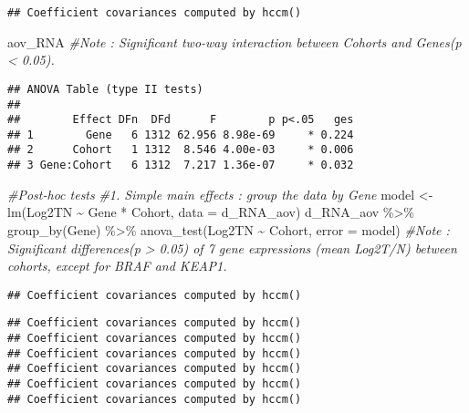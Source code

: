 \documentclass[
]{article}
\newenvironment{Shaded}{\begin{snugshade}}{\end{snugshade}}
\newcommand{\AttributeTok}[1]{\textcolor[rgb]{0.77,0.63,0.00}{#1}}
\newcommand{\CommentTok}[1]{\textcolor[rgb]{0.56,0.35,0.01}{\textit{#1}}}
\newcommand{\FunctionTok}[1]{\textcolor[rgb]{0.00,0.00,0.00}{#1}}
\newcommand{\NormalTok}[1]{#1}
\newcommand{\OtherTok}[1]{\textcolor[rgb]{0.56,0.35,0.01}{#1}}
\newcommand{\SpecialCharTok}[1]{\textcolor[rgb]{0.00,0.00,0.00}{#1}}
\begin{document}
\begin{verbatim}
## Coefficient covariances computed by hccm()
\end{verbatim}

\begin{Shaded}
\begin{Highlighting}[]
\NormalTok{aov\_RNA }\CommentTok{\#Note : Significant two{-}way interaction between Cohorts and Genes(p \textless{} 0.05).}
\end{Highlighting}
\end{Shaded}

\begin{verbatim}
## ANOVA Table (type II tests)
## 
##        Effect DFn  DFd      F        p p<.05   ges
## 1        Gene   6 1312 62.956 8.98e-69     * 0.224
## 2      Cohort   1 1312  8.546 4.00e-03     * 0.006
## 3 Gene:Cohort   6 1312  7.217 1.36e-07     * 0.032
\end{verbatim}

\begin{Shaded}
\begin{Highlighting}[]
\CommentTok{\#Post{-}hoc tests}
\CommentTok{\#1. Simple main effects : group the data by Gene}
\NormalTok{model }\OtherTok{\textless{}{-}} \FunctionTok{lm}\NormalTok{(Log2TN }\SpecialCharTok{\textasciitilde{}}\NormalTok{ Gene }\SpecialCharTok{*}\NormalTok{ Cohort, }\AttributeTok{data =}\NormalTok{ d\_RNA\_aov)}
\NormalTok{d\_RNA\_aov }\SpecialCharTok{\%\textgreater{}\%}
  \FunctionTok{group\_by}\NormalTok{(Gene) }\SpecialCharTok{\%\textgreater{}\%}
  \FunctionTok{anova\_test}\NormalTok{(Log2TN }\SpecialCharTok{\textasciitilde{}}\NormalTok{ Cohort, }\AttributeTok{error =}\NormalTok{ model) }\CommentTok{\#Note : Significant differences(p \textgreater{} 0.05) of 7 gene expressions (mean Log2T/N) between cohorts, except for BRAF and KEAP1.}
\end{Highlighting}
\end{Shaded}

\begin{verbatim}
## Coefficient covariances computed by hccm()
\end{verbatim}

\begin{verbatim}
## Coefficient covariances computed by hccm()
## Coefficient covariances computed by hccm()
## Coefficient covariances computed by hccm()
## Coefficient covariances computed by hccm()
## Coefficient covariances computed by hccm()
## Coefficient covariances computed by hccm()
\end{verbatim}
\end{document}
